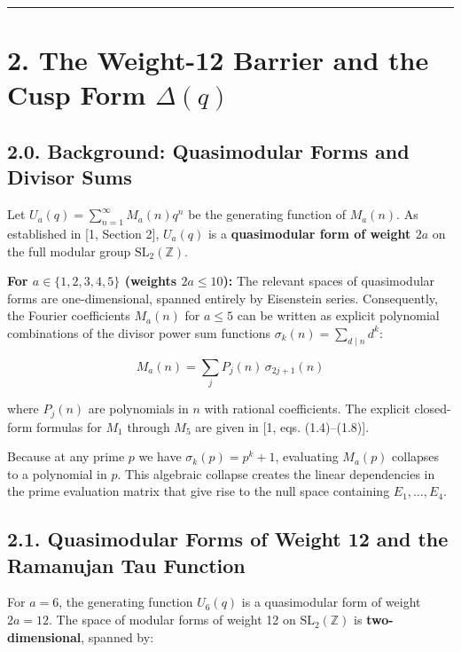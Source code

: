 \documentclass[
  11pt,
]{article}
\begin{document}
\begin{center}\rule{0.5\linewidth}{0.5pt}\end{center}

\section{\texorpdfstring{2. The Weight-12 Barrier and the Cusp Form
\(\Delta(q)\)}{2. The Weight-12 Barrier and the Cusp Form \textbackslash Delta(q)}}\label{the-weight-12-barrier-and-the-cusp-form-deltaq}

\subsection{2.0. Background: Quasimodular Forms and Divisor
Sums}\label{background-quasimodular-forms-and-divisor-sums}

Let \(U_a(q) = \sum_{n=1}^{\infty} M_a(n) q^n\) be the generating
function of \(M_a(n)\). As established in {[}1, Section 2{]}, \(U_a(q)\)
is a \textbf{quasimodular form of weight \(2a\)} on the full modular
group \(\mathrm{SL}_2(\mathbb{Z})\).

\textbf{For \(a \in \{1,2,3,4,5\}\) (weights \(2a \leq 10\)):} The
relevant spaces of quasimodular forms are one-dimensional, spanned
entirely by Eisenstein series. Consequently, the Fourier coefficients
\(M_a(n)\) for \(a \leq 5\) can be written as explicit polynomial
combinations of the divisor power sum functions
\(\sigma_k(n) = \sum_{d \mid n} d^k\):

\[M_a(n) = \sum_j P_j(n)\,\sigma_{2j+1}(n)\]

where \(P_j(n)\) are polynomials in \(n\) with rational coefficients.
The explicit closed-form formulas for \(M_1\) through \(M_5\) are given
in {[}1, eqs. (1.4)--(1.8){]}.

Because at any prime \(p\) we have \(\sigma_k(p) = p^k + 1\), evaluating
\(M_a(p)\) collapses to a polynomial in \(p\). This algebraic collapse
creates the linear dependencies in the prime evaluation matrix that give
rise to the null space containing \(E_1,\ldots,E_4\).

\subsection{2.1. Quasimodular Forms of Weight 12 and the Ramanujan Tau
Function}\label{quasimodular-forms-of-weight-12-and-the-ramanujan-tau-function}

For \(a = 6\), the generating function \(U_6(q)\) is a quasimodular form
of weight \(2a = 12\). The space of modular forms of weight 12 on
\(\mathrm{SL}_2(\mathbb{Z})\) is \textbf{two-dimensional}, spanned by:
\end{document}
